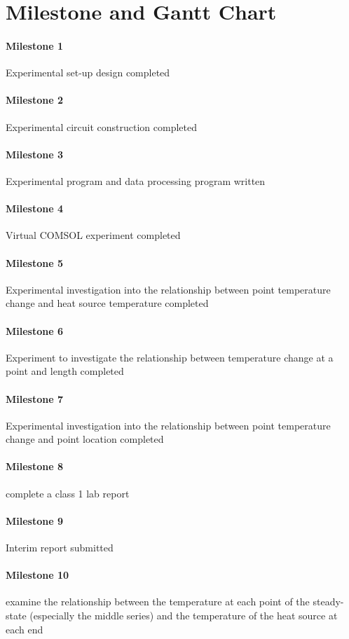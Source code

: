 \documentclass[a4paper,12pt]{article}
\begin{document}
\section{Milestone and Gantt Chart}

\paragraph{Milestone 1} Experimental set-up design completed
\paragraph{Milestone 2} Experimental circuit construction completed
\paragraph{Milestone 3} Experimental program and data processing program written
\paragraph{Milestone 4} Virtual COMSOL experiment completed
\paragraph{Milestone 5} Experimental investigation into the relationship between point temperature change and heat source temperature completed
\paragraph{Milestone 6} Experiment to investigate the relationship between temperature change at a point and length completed
\paragraph{Milestone 7} Experimental investigation into the relationship between point temperature change and point location completed
\paragraph{Milestone 8} complete a class 1 lab report
\paragraph{Milestone 9} Interim report submitted
\paragraph{Milestone 10} examine the relationship between the temperature at each point of the steady-state (especially the middle series) and the temperature of the heat source at each end
\end{document}
